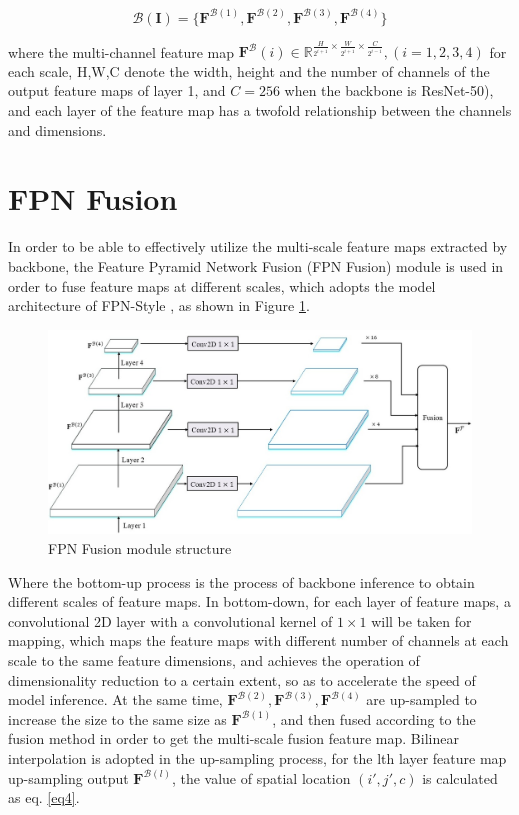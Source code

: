 \begin{equation}
\label{eq3}
  \mathcal{B}(\mathbf{I}) = \{ \mathbf{F}^{\mathcal{B}(1)}, \mathbf{F}^{\mathcal{B}(2)}, \mathbf{F}^{\mathcal{B}(3)}, \mathbf{F}^{\mathcal{B}(4)} \}
\end{equation}

where the multi-channel feature map $\mathbf{F}^\mathcal{B}(i) \in \mathbb{R}^{\frac{H}{2^{i+1}} \times \frac{W}{2^{i+1}} \times \frac{C}{2^{i-1}}},(i=1,2,3,4)$ for each scale, H,W,C denote the width, height and the number of channels of the output feature maps of layer 1, and $C=256$ when the backbone is ResNet-50), and each layer of the feature map has a twofold relationship between the channels and dimensions.

\section{FPN Fusion}

In order to be able to effectively utilize the multi-scale feature maps extracted by backbone, the Feature Pyramid Network Fusion (FPN Fusion) module is used in order to fuse feature maps at different scales, which adopts the model architecture of FPN-Style \cite{23}, as shown in Figure \ref{fig:fpn}.

\begin{figure}[htbp]
  \begin{center}
      \includegraphics[scale=0.45]{figure/fpn.jpg}
  \end{center}
  \caption{FPN Fusion module structure}
  \label{fig:fpn}
\end{figure}

Where the bottom-up process is the process of backbone inference to obtain different scales of feature maps. In bottom-down, for each layer of feature maps, a convolutional 2D layer with a convolutional kernel of $1\times 1$ will be taken for mapping, which maps the feature maps with different number of channels at each scale to the same feature dimensions, and achieves the operation of dimensionality reduction to a certain extent, so as to accelerate the speed of model inference. At the same time, $\mathbf{F}^{\mathcal{B}(2)} ,\mathbf{F}^{\mathcal{B}(3)} ,\mathbf{F}^{\mathcal{B}(4)}$ are up-sampled to increase the size to the same size as $\mathbf{F}^{\mathcal{B}(1)}$, and then fused according to the fusion method in order to get the multi-scale fusion feature map. Bilinear interpolation \cite{18} is adopted in the up-sampling process, for the lth layer feature map up-sampling output $\mathbf{F}^{\mathcal{B}(l)}$, the value of spatial location $(i',j',c)$ is calculated as eq. \ref{eq4}.

